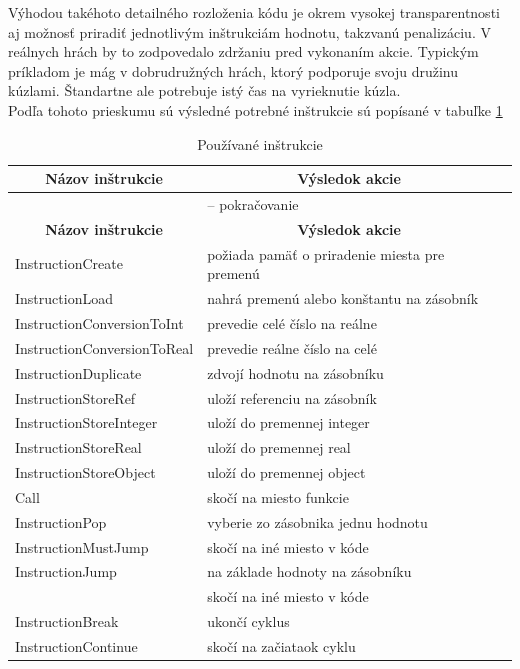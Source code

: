 Výhodou takéhoto detailného rozloženia kódu je okrem vysokej transparentnosti aj možnosť priradiť jednotlivým inštrukciám hodnotu, takzvanú penalizáciu. V reálnych hrách by to zodpovedalo zdržaniu pred vykonaním akcie. Typickým príkladom je mág v dobrudružných hrách, ktorý podporuje svoju družinu kúzlami. Štandartne ale potrebuje istý čas na vyrieknutie kúzla.\\
Podľa tohoto prieskumu sú výsledné potrebné inštrukcie sú popísané v tabuľke \ref{tab:instrukcie}
\begin{center}
\begin{longtable}{|l|l|l|}
\caption[Používané inštrukcie]{Používané inštrukcie}
\label{tab:instrukcie}\\
\multicolumn{1}{c}{\textbf{Názov inštrukcie}} &
\multicolumn{1}{c}{\textbf{Výsledok akcie}} \\\hline 
\endfirsthead
\multicolumn{2}{c}{{\tablename} \thetable{} -- pokračovanie} \\[0.5ex]
\multicolumn{1}{c}{\textbf{Názov inštrukcie}} &
\multicolumn{1}{c}{\textbf{Výsledok akcie}} \\\hline
\endhead
InstructionCreate& požiada pamäť o priradenie miesta pre premenú \\
InstructionLoad& nahrá premenú alebo konštantu na zásobník \\
InstructionConversionToInt& prevedie celé číslo na reálne\\
InstructionConversionToReal& prevedie reálne číslo na celé\\
InstructionDuplicate& zdvojí hodnotu na zásobníku\\
InstructionStoreRef& uloží referenciu na zásobník \\
InstructionStoreInteger& uloží do premennej integer \\
InstructionStoreReal& uloží do premennej real\\
InstructionStoreObject& uloží do premennej object\\
Call&  skočí na miesto funkcie \\
InstructionPop& vyberie zo zásobnika jednu hodnotu\\
InstructionMustJump& skočí na iné miesto v kóde\\
InstructionJump& na základe hodnoty na zásobníku \\
&skočí na iné miesto v kóde \\
InstructionBreak& ukončí cyklus \\
InstructionContinue& skočí na začiataok cyklu\\

\end{longtable}
\end{center}
